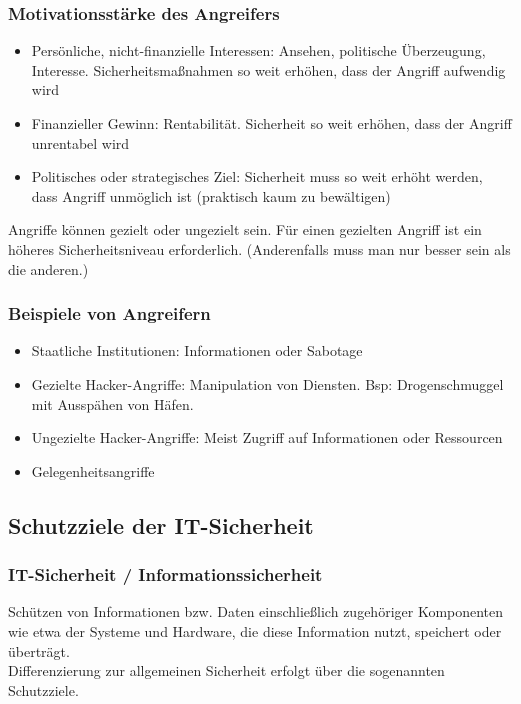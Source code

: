 \subsubsection{Motivationsstärke des Angreifers}
\begin{itemize}
	\item Persönliche, nicht-finanzielle Interessen: Ansehen, politische Überzeugung, Interesse. Sicherheitsmaßnahmen so weit erhöhen, dass der Angriff aufwendig wird
	\item Finanzieller Gewinn: Rentabilität. Sicherheit so weit erhöhen, dass der Angriff unrentabel wird
	\item Politisches oder strategisches Ziel: Sicherheit muss so weit erhöht werden, dass Angriff unmöglich ist (praktisch kaum zu bewältigen)
\end{itemize}

Angriffe können gezielt oder ungezielt sein. Für einen gezielten Angriff ist ein höheres Sicherheitsniveau erforderlich. (Anderenfalls muss man nur besser sein als die anderen.)

\subsubsection{Beispiele von Angreifern}
\begin{itemize}
	\item Staatliche Institutionen: Informationen oder Sabotage
	\item Gezielte Hacker-Angriffe: Manipulation von Diensten. Bsp: Drogenschmuggel mit Ausspähen von Häfen.
	\item Ungezielte Hacker-Angriffe: Meist Zugriff auf Informationen oder Ressourcen
	\item Gelegenheitsangriffe
\end{itemize}


\subsection{Schutzziele der IT-Sicherheit}

\subsubsection{IT-Sicherheit / Informationssicherheit}
Schützen von Informationen bzw. Daten einschließlich zugehöriger Komponenten wie etwa der Systeme und Hardware, die diese Information nutzt, speichert oder überträgt.\\
Differenzierung zur allgemeinen Sicherheit erfolgt über die sogenannten Schutzziele.

